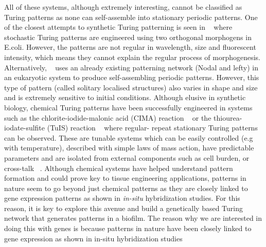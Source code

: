 All of these systems, although extremely interesting, cannot be classified as Turing patterns as none can self-assemble into stationary periodic patterns.
One of the closest attempts to synthetic Turing patterning is seen in ~\parencite{Karig2018} where stochastic Turing patterns are engineered using two orthogonal morphogens in E.coli. %
However, the patterns are not regular in wavelength, size and fluorescent intensity, which means they cannot explain the regular process of morphogenesis.
Alternatively, ~\cite{Sekine2018} uses an already existing patterning network (Nodal and lefty) in an eukaryotic system to produce self-assembling periodic patterns.
However, this type of pattern (called solitary localised structures) also varies in shape and size and is extremely sensitive to initial conditions.
Although elusive in synthetic biology, chemical Turing patterns have been successfully engineered in systems such as the chlorite-iodide-malonic acid (CIMA) reaction ~\parencite{Castets, Lengyel1992} or the thiourea-iodate-sulfite (TuIS) reaction ~\parencite{Horvath} where regular- repeat stationary Turing patterns can be observed.  %
These are tunable systems which can be easily controlled (e.g with temperature), described with simple laws of mass action, have predictable parameters and are isolated from external components such as cell burden, or cross-talk ~\parencite{Butzin2018, Ceroni2015, Du2020, Nielsen2016}. %
Although chemical systems have helped understand pattern formation and could prove key to tissue engineering applications, patterns in nature seem to go beyond just chemical patterns as they are closely linked to gene expression patterns as shown in \textit{in-situ} hybridization studies. %
For this reason, it is key to explore this avenue and build a genetically based Turing network that generates patterns in a biofilm.
The reason why we are interested in doing this with genes is because patterns in nature have been closely linked to gene expression as shown in in-situ hybridization studies





